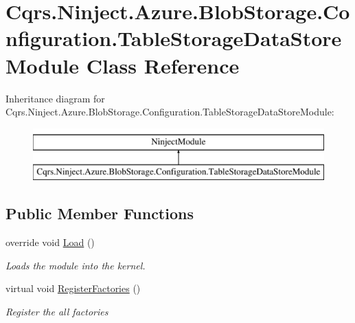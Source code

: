 \hypertarget{classCqrs_1_1Ninject_1_1Azure_1_1BlobStorage_1_1Configuration_1_1TableStorageDataStoreModule}{}\section{Cqrs.\+Ninject.\+Azure.\+Blob\+Storage.\+Configuration.\+Table\+Storage\+Data\+Store\+Module Class Reference}
\label{classCqrs_1_1Ninject_1_1Azure_1_1BlobStorage_1_1Configuration_1_1TableStorageDataStoreModule}
Inheritance diagram for Cqrs.\+Ninject.\+Azure.\+Blob\+Storage.\+Configuration.\+Table\+Storage\+Data\+Store\+Module\+:\begin{figure}[H]
\begin{center}
\leavevmode
\includegraphics[height=2.000000cm]{classCqrs_1_1Ninject_1_1Azure_1_1BlobStorage_1_1Configuration_1_1TableStorageDataStoreModule}
\end{center}
\end{figure}
\subsection*{Public Member Functions}
\begin{DoxyCompactItemize}
\item 
override void \hyperlink{classCqrs_1_1Ninject_1_1Azure_1_1BlobStorage_1_1Configuration_1_1TableStorageDataStoreModule_a6001f43d3102af95c34cf7f17757744e_a6001f43d3102af95c34cf7f17757744e}{Load} ()
\begin{DoxyCompactList}\small\item\em Loads the module into the kernel. \end{DoxyCompactList}\item 
virtual void \hyperlink{classCqrs_1_1Ninject_1_1Azure_1_1BlobStorage_1_1Configuration_1_1TableStorageDataStoreModule_a785a2d032063d28d39d0c0f66f5f727f_a785a2d032063d28d39d0c0f66f5f727f}{Register\+Factories} ()
\begin{DoxyCompactList}\small\item\em Register the all factories \end{DoxyCompactList}\end{DoxyCompactItemize}


